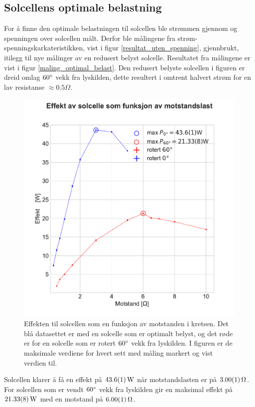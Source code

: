 \documentclass[%
 reprint,
 amsmath,amssymb,
 aps,
 norsk,
 booktabs
]{revtex4-1}
\begin{document}
\subsection{Solcellens optimale belastning}
For å finne den optimale belastningen til solcellen ble strømmen gjennom og spenningen over solcellen målt. Derfor ble målingene fra strøm-spenningskarkateristikken, vist i figur \vref{resultat_uten_spenning}, gjennbrukt, itilegg til nye målinger av en redusert belyst solcelle. Resultatet fra målingene er vist i figur \vref{maling_optimal_belast}. Den redusert belyste solcellen i figuren er dreid omlag $60\degree$ vekk fra lyskilden, dette resultert i omtrent halvert strøm for en lav resistanse $\approx 0.5\Omega$.
\begin{figure}
  \centering
  \includegraphics[scale=0.47]{effekt.pdf}
  \caption{Effekten til solcellen som en funksjon av motstanden i kretsen. Det blå datasettet er med en solcelle som er optimalt belyst, og det røde er for en solcelle som er rotert $60\degree$ vekk fra lyskilden. I figuren er de maksimale verdiene for hvert sett med måling markert og vist verdien til.}
  \label{maling_optimal_belast}
\end{figure}
Solcellen klarer å få en effekt på $\SI{43.6\pm0.1}{\watt}$ når motstandslasten er på $\SI{3.00\pm0.01}{\Omega}$. For solcellen som er vendt $60\degree$ vekk fra lyskilden gir en maksimal effekt på $\SI{21.33\pm0.08}{\watt}$ med en motstand på $\SI{6.00\pm0.01}{\Omega}$.
\newpage
\end{document}
